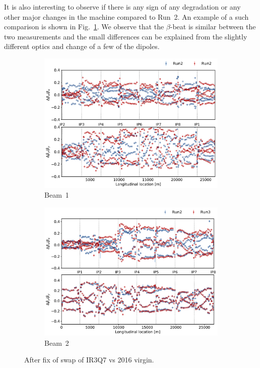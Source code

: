 \documentclass{cernatsnote}
\begin{document}
It is also interesting to observe if there is any sign of any degradation or any other major changes in the machine compared to Run~2. An example of a such comparison is shown in Fig.~\ref{fig:after_swap_vs_2016}. We observe that the $\beta$-beat is similar between the two measurements and the small differences can be explained from the slightly different optics and change of a few of the dipoles. 

\begin{figure}[ht]
\begin{subfigure}{.5\textwidth}
  \centering
  \includegraphics[width=.8\linewidth]{inj_linear/beamtest/beam1/beta_beat_virgin_2016_2021.pdf}  
  \caption{Beam~1}
\end{subfigure}
\begin{subfigure}{.5\textwidth}
  \centering
  \includegraphics[width=.8\linewidth]{inj_linear/beamtest/beam2/B2_BetaBeat_afterIR3Q7fix_vs_virgin2016.pdf}  
  \caption{Beam~2}
\end{subfigure}
\caption{After fix of swap of IR3Q7 vs 2016 virgin.}
\label{fig:after_swap_vs_2016}
\end{figure}
\end{document}
